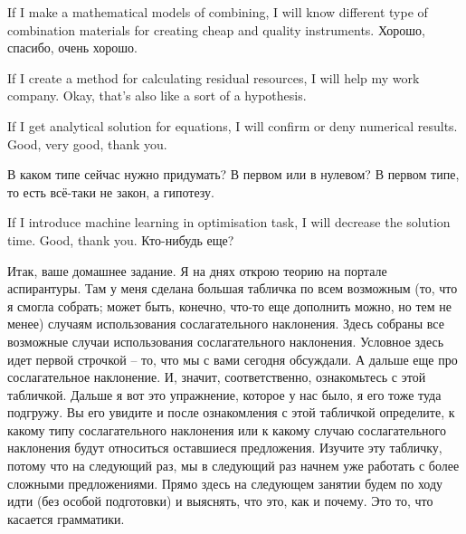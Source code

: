 \documentclass[main.tex]{subfiles}
\begin{document}
If I make a mathematical models of combining, I will know different type of combination materials for creating cheap and quality instruments.
Хорошо, спасибо, очень хорошо.

If I create a method for calculating residual resources, I will help my work company.
Okay, that's also like a sort of a hypothesis.

If I get analytical solution for equations, I will confirm or deny numerical results.
Good, very good, thank you.

В каком типе сейчас нужно придумать?
В первом или в нулевом?
В первом типе, то есть всё-таки не закон, а гипотезу.

If I introduce machine learning in optimisation task, I will decrease the solution time.
Good, thank you.
Кто-нибудь еще?

Итак, ваше домашнее задание.
Я на днях открою теорию на портале аспирантуры.
Там у меня сделана большая табличка по всем возможным (то, что я смогла собрать; может быть, конечно, что-то еще дополнить можно, но тем не менее) случаям использования сослагательного наклонения.
Здесь собраны все возможные случаи использования сослагательного наклонения.
Условное здесь идет первой строчкой -- то, что мы с вами сегодня обсуждали.
А дальше еще про сослагательное наклонение.
И, значит, соответственно, ознакомьтесь с этой табличкой.
Дальше я вот это упражнение, которое у нас было, я его тоже туда подгружу.
Вы его увидите и после ознакомления с этой табличкой определите, к какому типу сослагательного наклонения или к какому случаю сослагательного наклонения будут относиться оставшиеся предложения.
Изучите эту табличку, потому что на следующий раз, мы в следующий раз начнем уже работать с более сложными предложениями.
Прямо здесь на следующем занятии будем по ходу идти (без особой подготовки) и выяснять, что это, как и почему.
Это то, что касается грамматики.
\end{document}

